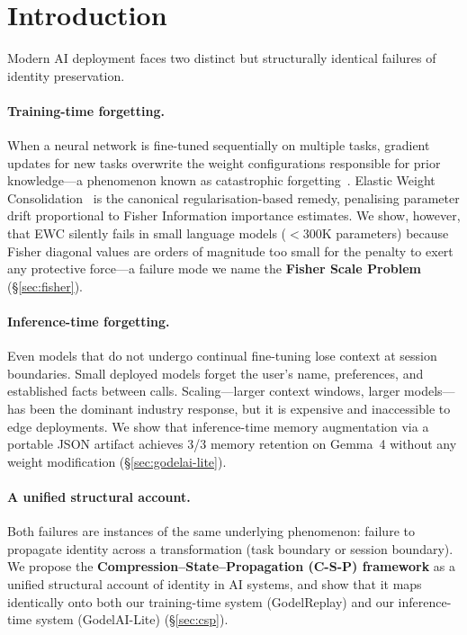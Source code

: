 \documentclass[12pt]{article}
\newcommand{\godelreplay}{GodelReplay\xspace}
\begin{document}
\section{Introduction}
\label{sec:intro}

Modern AI deployment faces two distinct but structurally identical failures of
identity preservation.

\paragraph{Training-time forgetting.}
When a neural network is fine-tuned sequentially on multiple tasks,
gradient updates for new tasks overwrite the weight configurations responsible
for prior knowledge---a phenomenon known as catastrophic
forgetting~\citep{mccloskey1989catastrophic,goodfellow2013empirical}.
Elastic Weight Consolidation~\citep{kirkpatrick2017overcoming} is the canonical
regularisation-based remedy, penalising parameter drift proportional to Fisher
Information importance estimates.
We show, however, that EWC silently fails in small language models ($<$300K
parameters) because Fisher diagonal values are orders of magnitude too small
for the penalty to exert any protective force---a failure mode we name the
\textbf{Fisher Scale Problem} (\S\ref{sec:fisher}).

\paragraph{Inference-time forgetting.}
Even models that do not undergo continual fine-tuning lose context at session
boundaries. Small deployed models forget the user's name, preferences, and
established facts between calls.
Scaling---larger context windows, larger models---has been the dominant
industry response, but it is expensive and inaccessible to edge deployments.
We show that inference-time memory augmentation via a portable JSON artifact
achieves 3/3 memory retention on Gemma~4 without any weight modification
(\S\ref{sec:godelai-lite}).

\paragraph{A unified structural account.}
Both failures are instances of the same underlying phenomenon: failure to
propagate identity across a transformation (task boundary or session boundary).
We propose the \textbf{Compression--State--Propagation (C-S-P) framework}
as a unified structural account of identity in AI systems, and show that it
maps identically onto both our training-time system (\godelreplay) and our
inference-time system (GodelAI-Lite) (\S\ref{sec:csp}).
\end{document}
